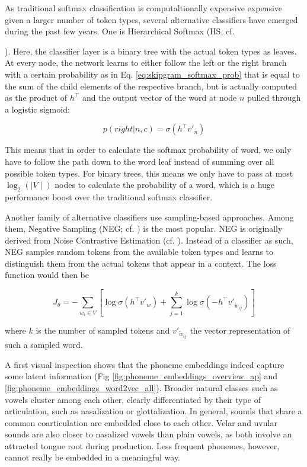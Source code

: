 \documentclass[6pt]{article}
\begin{document}
As traditional softmax classification is computaltionally expensive expensive given a larger number of token types, several alternative classifiers have emerged during the past few years. One is Hierarchical Softmax (HS, cf. {\cite{morin2005hierarchical}). Here, the classifier layer is a binary tree with the actual token types as leaves. At every node, the network learns to either follow the left or the right branch with a certain probability as in Eq. \ref{eq:skipgram_softmax_prob} that is equal to the sum of the child elements of the respective  branch, but is actually computed as the product of $h^\top$ and the output vector of the word at node $n$ pulled through a logistic sigmoid:

\begin{equation}
p(right|n,c) = \sigma(h^\top v'_n) 
\label{eq:hierarchicalsoftmax_nodeprob}
\end{equation}

This means that in order to calculate the softmax probability of word, we only have to follow the path down to the word leaf instead of summing over all possible token types. For binary trees, this means we only have to pass at most $\log_2(\mid V\mid)$ nodes to calculate the probability of a word, which is a huge performance boost over the traditional softmax classifier. 

Another family of alternative classifiers use sampling-based approaches. Among them, Negative Sampling (NEG; cf. \cite{goldberg2014word2vec}) is the most popular. NEG is originally derived from Noise Contrastive Estimation (cf. \cite{gutmann2010noise,mnih2012fast}). Instead of a classifier as such, NEG samples random tokens from the available token types and learns to distinguish them from the actual tokens that appear in a context. The loss function would then be

\begin{equation}
J_{\theta}  = - \sum_{w_i \in V} [\log \sigma(h^{\top}v'_w)
+ \sum_{j=1}^{k}\log \sigma(-h^{\top}v'_{\tilde{w}_{ij}})]
\label{eq:neg_sampling_3}
\end{equation}

where $k$ is the number of sampled tokens and $v'_{\tilde{w}_{ij}}$ the vector representation of such a sampled word.

A first visual inspection shows that the phoneme embeddings indeed capture some latent information (Fig \ref{fig:phoneme_embeddings_overview_ap} and \ref{fig:phoneme_embeddings_word2vec_all}). Broader natural classes such as vowels cluster among each other,  clearly differentiated by their type of articulation, such as nasalization or glottalization. In general, sounds that share a common coarticulation are embedded close to each other. Velar and uvular sounds are also closer to nasalized vowels than plain vowels, as both involve an attracted tongue root during production. Less frequent phonemes, however, cannot really be embedded in a meaningful way.

}
\end{document}
